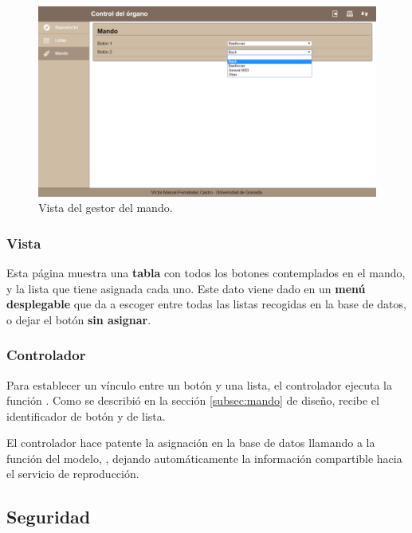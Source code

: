 \begin{figure}[H]
	\noindent \begin{centering}
		\includegraphics[width=\linewidth*3/4]{capitulo5/cap_mando}
		\par\end{centering}
	\smallskip
	\caption{\label{fig:cap_mando} Vista del gestor del mando.}
\end{figure} 

\smallskip

\subsubsection{Vista}

Esta página muestra una \textbf{tabla} con todos los botones contemplados en el mando, y la lista que tiene asignada cada uno. Este dato viene dado en un \textbf{menú desplegable} que da a escoger entre todas las listas recogidas en la base de datos, o dejar el botón \textbf{sin asignar}.

\subsubsection{Controlador}

Para establecer un vínculo entre un botón y una lista, el controlador ejecuta la función . Como se describió en la sección \ref{subsec:mando} de diseño, recibe el identificador de botón y de lista.

El controlador hace patente la asignación en la base de datos llamando a la función del modelo, , dejando automáticamente la información compartible hacia el servicio de reproducción.

\subsection{Seguridad}
\label{subsec:web_seguridad}

